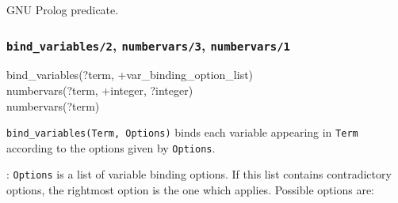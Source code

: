 \begin{PlErrors}




\end{PlErrors}

\Portability

GNU Prolog predicate.

\subsubsection{\texttt{bind\_variables/2},
               \texttt{numbervars/3},
               \texttt{numbervars/1}}
\label{bind-variables/2}

\begin{TemplatesOneCol}
bind\_variables(?term, +var\_binding\_option\_list)\\
numbervars(?term, +integer, ?integer)\\
numbervars(?term)

\end{TemplatesOneCol}

\Description

\texttt{bind\_variables(Term, Options)} binds each variable appearing in
\texttt{Term} according to the options given by \texttt{Options}. 

: \texttt{Options} is a list of variable
binding options. If this list contains contradictory options, the rightmost
option is the one which applies. Possible options are:

